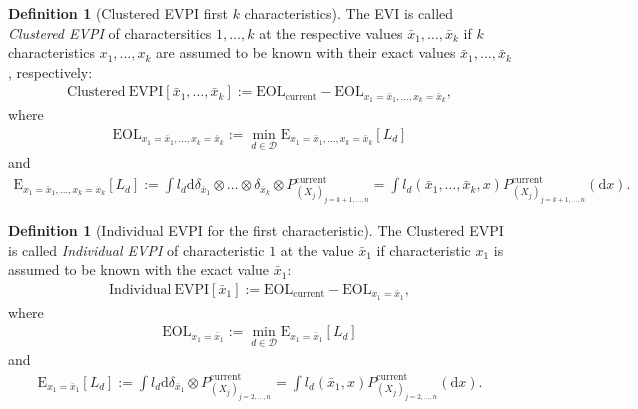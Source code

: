 \documentclass[a4paper,10pt,twoside,pagesize,abstracton]{scrartcl}
\renewcommand{\d}{\mathrm{d}\!} %
\newcommand{\E}[2][]{\mathrm{E}_{#1}\left[#2\right]} %
\newcommand{\EOL}[1][]{\mathrm{EOL}_{#1}} %
\newcommand{\EVPI}{\mathrm{EVPI}} %
\theoremstyle{plain}%
\theoremstyle{definition}
\newtheorem{defn}[thm]{Definition}
\theoremstyle{remark}
\begin{document}
\begin{defn}[Clustered EVPI first $k$ characteristics]
 The EVI is called \emph{Clustered EVPI} of charactersitics $1, \ldots, k$ at the respective values $\bar{x}_1, \ldots, \bar{x}_k$ if $k$ characteristics $x_1,\ldots, x_k$ are assumed to be known with their exact values $\bar{x}_1, \ldots, \bar{x}_k$, respectively:
\begin{align}
   \mathrm{Clustered~}\EVPI[\bar{x}_1, \ldots, \bar{x}_k] := \EOL[\mathrm{current}] - \EOL[x_1 =\bar{x}_1, \ldots, x_k = \bar{x}_k],
\end{align}
where 
\begin{align}
  \EOL[x_1 =\bar{x}_1, \ldots, x_k = \bar{x}_k] := \min_{d\in\mathcal{D}} \E[x_1 =\bar{x}_1, \ldots, x_k = \bar{x}_k]{L_d}
\end{align}
and 
\begin{align}
   \E[x_1 =\bar{x}_1, \ldots, x_k = \bar{x}_k]{L_d} := \int l_d \d \delta_{\bar{x}_1} \otimes \ldots \otimes \delta_{\bar{x}_k} \otimes P_{\left(X_j\right)_{j={k+1, \ldots, n}}}^{\mathrm{current}} = \int l_d \left( \bar{x}_1, \ldots, \bar{x}_k, x \right) P_{\left(X_j\right)_{j={k+1, \ldots, n}}}^{\mathrm{current}}\left( \d x\right).
\end{align}
\end{defn}
\begin{defn}[Individual EVPI for the first characteristic]
  The Clustered EVPI is called \emph{Individual EVPI} of characteristic $1$ at the value $\bar{x}_1$ if characteristic $x_1$ is assumed to be known with the exact value $\bar{x}_1$:
\begin{align}
   \mathrm{Individual~}\EVPI[\bar{x}_1] := \EOL[\mathrm{current}] - \EOL[x_1 =\bar{x}_1],
\end{align}
where 
\begin{align}
  \EOL[x_1 =\bar{x}_1] := \min_{d\in\mathcal{D}} \E[x_1 =\bar{x}_1]{L_d}
\end{align}
and 
\begin{align}
   \E[x_1 =\bar{x}_1]{L_d} := \int l_d \d \delta_{\bar{x}_1} \otimes P_{\left(X_j\right)_{j={2, \ldots, n}}}^{\mathrm{current}} = \int l_d \left( \bar{x}_1, x \right) P_{\left(X_j\right)_{j={2, \ldots, n}}}^{\mathrm{current}}\left( \d x\right).
\end{align}
\end{defn}
\end{document}
